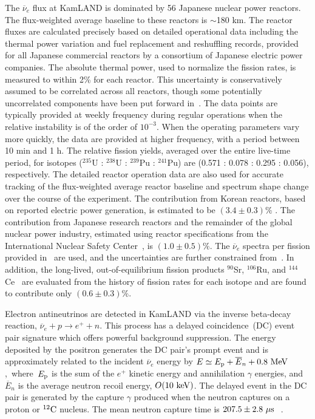 \documentclass[aps,prc,twocolumn,groupedaddress,showpacs,amsmath,amssymb,floatfix,superscriptaddress]{revtex4}
\begin{document}
The $\overline{\nu}_{e}$ flux at KamLAND is dominated by 56 Japanese nuclear power reactors. The flux-weighted average baseline to these reactors is $\sim$180 km.  The reactor fluxes are calculated precisely based on detailed operational data including the thermal power variation and fuel replacement and reshuffling records, provided for all Japanese commercial reactors by a consortium of Japanese electric power companies. The absolute thermal power, used to normalize the fission rates, is measured to within 2\% for each reactor. This uncertainty is conservatively assumed to be correlated across all reactors, though some potentially uncorrelated components have been put forward in~\cite{Djurcic2009}. The data points are typically provided at weekly frequency during regular operations when the relative instability is of the order of $10^{-3}$. When the operating parameters vary more quickly, the data are provided at higher frequency, with a period between 10 min and 1 h. The relative fission yields, averaged over the entire live-time period, for isotopes ($^{235}$U : $^{238}$U : $^{239}$Pu : $^{241}$Pu) are (0.571 : 0.078 : 0.295 : 0.056), respectively. The detailed reactor operation data are also used for accurate tracking of the flux-weighted average reactor baseline and spectrum shape change over the course of the experiment.  The contribution from Korean reactors, based on reported electric power generation, is estimated to be $(3.4 \pm 0.3)\%$ . The contribution from Japanese research reactors and the remainder of the global nuclear power industry, estimated using reactor specifications from the International Nuclear Safety Center~\cite{INSC2010}, is $(1.0 \pm 0.5)\%$. The $\overline{\nu}_{e}$ spectra per fission provided in~\cite{Schreckenbach1985, Hahn1989, Vogel1981} are used, and the uncertainties are further constrained from~\cite{Achkar1996}. In addition, the long-lived, out-of-equilibrium fission products $^{90}$Sr, $^{106}$Ru, and $^{144}$Ce~\cite{Kopeikin2001} are evaluated from the history of fission rates for each isotope and are found to contribute only $(0.6 \pm 0.3)\%$.

Electron antineutrinos are detected in KamLAND via the inverse beta-decay reaction, \mbox{$\overline{\nu}_{e}+p\rightarrow e^{+}+n$}. This process has a delayed coincidence~(DC) event pair signature which offers powerful background suppression.  The energy deposited by the positron generates the DC pair's prompt event and is approximately related to the incident $\overline{\nu}_{e}$ energy by \mbox{$E \simeq E_{\rm p} + \overline{E}_{n} + 0.8 ~{\rm MeV}$, where $E_{\rm p}$} is the sum of the $e^{+}$ kinetic energy and annihilation $\gamma$ energies, and $\overline{E}_{n}$ is the average neutron recoil energy, $O(10 ~\rm{keV})$. The delayed event in the DC pair is generated by the capture $\gamma$ produced when the neutron captures on a proton or $^{12}{\rm C}$ nucleus. The mean neutron capture time is $207.5 \pm 2.8 ~\mu \rm{s}$~\cite{Abe2010}\,.
\end{document}
